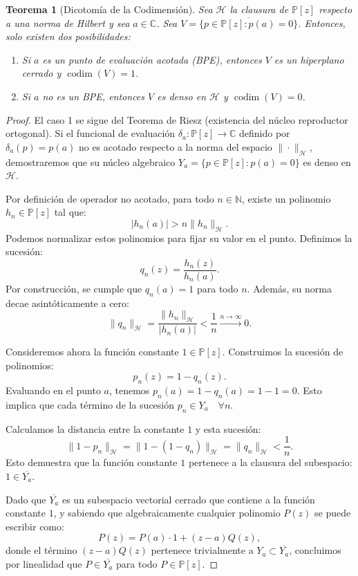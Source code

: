 \documentclass[12pt,a4paper]{article}
\newtheorem{teorema}{Teorema}
\theoremstyle{definition}
\theoremstyle{remark}
\newcommand{\C}{\mathbb{C}}
\newcommand{\Poly}{\mathbb{P}[z]}
\begin{document}
\begin{teorema}[Dicotomía de la Codimensión]
    Sea $\mathcal{H}$ la clausura de $\Poly$ respecto a una norma de Hilbert y sea $a \in \C$. Sea $V = \overline{\{p \in \Poly : p(a)=0\}}$. Entonces, solo existen dos posibilidades:
    \begin{enumerate}
        \item Si $a$ es un punto de evaluación acotada (BPE), entonces $V$ es un hiperplano cerrado y $\operatorname{codim}(V) = 1$.
        \item Si $a$ no es un BPE, entonces $V$ es denso en $\mathcal{H}$ y $\operatorname{codim}(V) = 0$.
    \end{enumerate}
\end{teorema}

\begin{proof}
    El caso 1 se sigue del Teorema de Riesz (existencia del núcleo reproductor ortogonal).
    Si el funcional de evaluación $\delta_a: \Poly \to \C$ definido por $\delta_a(p) = p(a)$ no es acotado respecto a la norma del espacio $\|\cdot\|_{\mathcal{H}}$, demostraremos que su núcleo algebraico $Y_a = \{p \in \Poly : p(a)=0\}$ es denso en $\mathcal{H}$.


    Por definición de operador no acotado, para todo $n \in \mathbb{N}$, existe un polinomio $h_n \in \Poly$ tal que:
    $$ |h_n(a)| > n \|h_n\|_{\mathcal{H}}. $$
    Podemos normalizar estos polinomios para fijar su valor en el punto. Definimos la sucesión:
    $$ q_n(z) = \frac{h_n(z)}{h_n(a)}. $$
    Por construcción, se cumple que $q_n(a) = 1$ para todo $n$. Además, su norma decae asintóticamente a cero:
    $$ \|q_n\|_{\mathcal{H}} = \frac{\|h_n\|_{\mathcal{H}}}{|h_n(a)|} < \frac{1}{n} \xrightarrow{n\to\infty} 0. $$


    Consideremos ahora la función constante $1 \in \Poly$. Construimos la sucesión de polinomios:
    $$ p_n(z) = 1 - q_n(z). $$
    Evaluando en el punto $a$, tenemos $p_n(a) = 1 - q_n(a) = 1 - 1 = 0$. Esto implica que cada término de la sucesión  $p_n \in Y_a \quad \forall n$.

    Calculamos la distancia entre la constante $1$ y esta sucesión:
    $$ \|1 - p_n\|_{\mathcal{H}} = \|1 - (1 - q_n)\|_{\mathcal{H}} = \|q_n\|_{\mathcal{H}} < \frac{1}{n}. $$
    Esto demuestra que la función constante $1$ pertenece a la clausura del subespacio: $1 \in \overline{Y_a}$.


    Dado que $\overline{Y_a}$ es un subespacio vectorial cerrado que contiene a la función constante $1$, y sabiendo que algebraicamente cualquier polinomio $P(z)$ se puede escribir como:
    $$ P(z) = P(a)\cdot 1 + (z-a)Q(z), $$
    donde el término $(z-a)Q(z)$ pertenece trivialmente a $Y_a \subset \overline{Y_a}$, concluimos por linealidad que $P \in \overline{Y_a}$ para todo $P \in \Poly$.



\end{proof}
\end{document}
